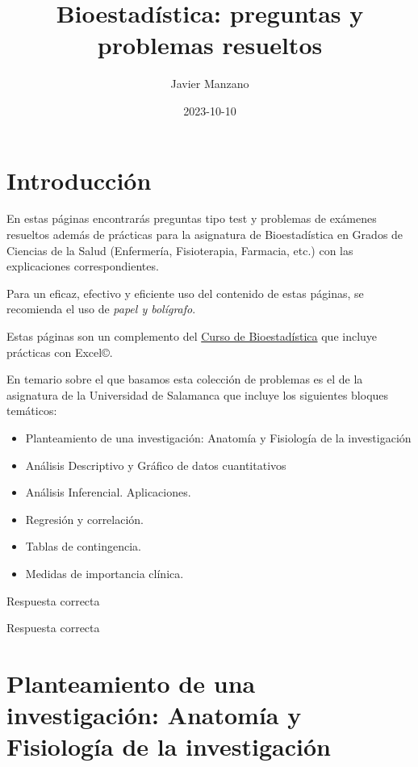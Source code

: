 \documentclass[
]{book}
\title{Bioestadística: preguntas y problemas resueltos}
\author{Javier Manzano}
\date{2023-10-10}
\begin{document}
\maketitle

{
\setcounter{tocdepth}{1}
\tableofcontents
}
\hypertarget{introducciuxf3n}{%
\chapter{Introducción}\label{introducciuxf3n}}

En estas páginas encontrarás preguntas tipo test y problemas de exámenes resueltos además de prácticas para la asignatura de Bioestadística en Grados de Ciencias de la Salud (Enfermería, Fisioterapia, Farmacia, etc.) con las explicaciones correspondientes.

Para un eficaz, efectivo y eficiente uso del contenido de estas páginas, se recomienda el uso de \emph{papel y bolígrafo}.

Estas páginas son un complemento del \href{https://1fjmanzano.github.io/bioestadistica/}{Curso de Bioestadística} que incluye prácticas con Excel©.

En temario sobre el que basamos esta colección de problemas es el de la asignatura de la Universidad de Salamanca que incluye los siguientes bloques temáticos:

\begin{itemize}
\item
  Planteamiento de una investigación: Anatomía y Fisiología de la investigación
\item
  Análisis Descriptivo y Gráfico de datos cuantitativos
\item
  Análisis Inferencial. Aplicaciones.
\item
  Regresión y correlación.
\item
  Tablas de contingencia.
\item
  Medidas de importancia clínica.
\end{itemize}

Respuesta correcta

Respuesta correcta

\hypertarget{planteamiento-de-una-investigaciuxf3n-anatomuxeda-y-fisiologuxeda-de-la-investigaciuxf3n}{%
\chapter{Planteamiento de una investigación: Anatomía y Fisiología de la investigación}\label{planteamiento-de-una-investigaciuxf3n-anatomuxeda-y-fisiologuxeda-de-la-investigaciuxf3n}}
\end{document}
